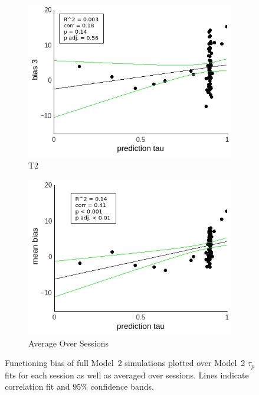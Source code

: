 \documentclass[a4paper]{scrreprt}
\begin{document}
\begin{figure}
\begin{subfigure}[b]{0.49\textwidth}
        \includegraphics[width=\textwidth]{figs/sec3/pred/pred_diff_3_mod2mod2.jpeg}
        \caption{T2}
    \end{subfigure}
    \begin{subfigure}[b]{0.49\textwidth}
        \includegraphics[width=\textwidth]{figs/sec3/pred/pred_diff_mean_mod2mod2.jpeg}
        \caption{Average Over Sessions}
    \end{subfigure}
\caption{Functioning bias of full Model~2 simulations plotted over Model~2 $\tau_p$ fits for each session as well as averaged over sessions. Lines indicate correlation fit and 95\% confidence bands.}
\label{fig:pred_diff_mod2mod2}
\end{figure}
\end{document}
